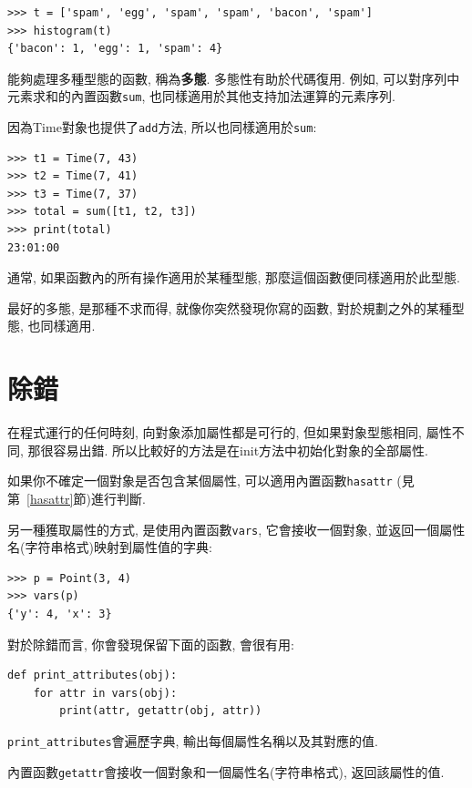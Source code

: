 \documentclass[10pt]{book}
\begin{document}
\begin{verbatim}
>>> t = ['spam', 'egg', 'spam', 'spam', 'bacon', 'spam']
>>> histogram(t)
{'bacon': 1, 'egg': 1, 'spam': 4}
\end{verbatim}
%
能夠處理多種型態的函數, 稱為{\bf 多態}. 
多態性有助於代碼復用. 
例如, 可以對序列中元素求和的內置函數{\tt sum}, 
也同樣適用於其他支持加法運算的元素序列. 

因為Time對象也提供了{\tt add}方法, 所以也同樣適用於{\tt sum}:

\begin{verbatim}
>>> t1 = Time(7, 43)
>>> t2 = Time(7, 41)
>>> t3 = Time(7, 37)
>>> total = sum([t1, t2, t3])
>>> print(total)
23:01:00
\end{verbatim}
%
通常, 如果函數內的所有操作適用於某種型態, 那麼這個函數便同樣適用於此型態. 

最好的多態, 是那種不求而得, 
就像你突然發現你寫的函數, 對於規劃之外的某種型態, 也同樣適用. 


\section{除錯}

在程式運行的任何時刻, 向對象添加屬性都是可行的, 
但如果對象型態相同, 屬性不同, 那很容易出錯. 
所以比較好的方法是在init方法中初始化對象的全部屬性. 

如果你不確定一個對象是否包含某個屬性, 可以適用內置函數{\tt hasattr}
 (見第~\ref{hasattr}節)進行判斷. 

另一種獲取屬性的方式, 是使用內置函數{\tt vars},
它會接收一個對象, 並返回一個屬性名(字符串格式)映射到屬性值的字典:

\begin{verbatim}
>>> p = Point(3, 4)
>>> vars(p)
{'y': 4, 'x': 3}
\end{verbatim}
%

對於除錯而言, 你會發現保留下面的函數, 會很有用:

\begin{verbatim}
def print_attributes(obj):
    for attr in vars(obj):
        print(attr, getattr(obj, attr))
\end{verbatim}
%
\verb"print_attributes"會遍歷字典, 輸出每個屬性名稱以及其對應的值. 

內置函數{\tt getattr}會接收一個對象和一個屬性名(字符串格式), 返回該屬性的值. 
\end{document}
